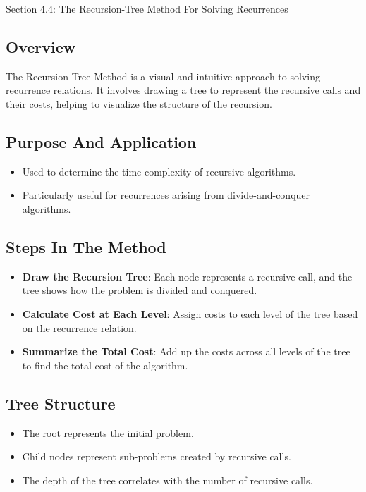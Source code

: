 \begin{notes}{Section 4.4: The Recursion-Tree Method For Solving Recurrences}
    \subsection*{Overview}

    The Recursion-Tree Method is a visual and intuitive approach to solving recurrence relations. It involves drawing a tree to represent the recursive calls and their costs, helping to visualize the 
    structure of the recursion. \vspace*{1em}

    \subsection*{Purpose And Application}

    \begin{itemize}
        \item Used to determine the time complexity of recursive algorithms.
        \item Particularly useful for recurrences arising from divide-and-conquer algorithms.
    \end{itemize}

    \subsection*{Steps In The Method}

    \begin{itemize}
        \item \textbf{Draw the Recursion Tree}: Each node represents a recursive call, and the tree shows how the problem is divided and conquered.
        \item \textbf{Calculate Cost at Each Level}: Assign costs to each level of the tree based on the recurrence relation.
        \item \textbf{Summarize the Total Cost}: Add up the costs across all levels of the tree to find the total cost of the algorithm.
    \end{itemize}

    \subsection*{Tree Structure}

    \begin{itemize}
        \item The root represents the initial problem.
        \item Child nodes represent sub-problems created by recursive calls.
        \item The depth of the tree correlates with the number of recursive calls.
    \end{itemize}


\end{notes}
